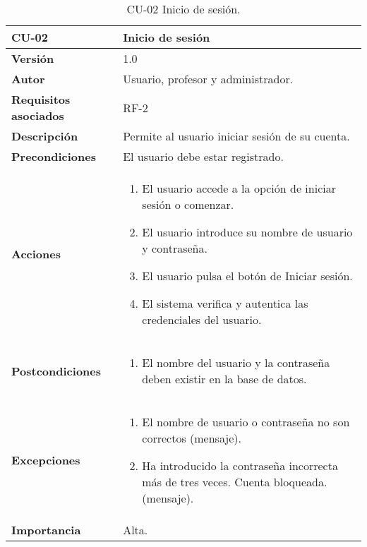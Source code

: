 \begin{table}[p]
	\centering
	\begin{tabularx}{\linewidth}{ p{} p{} }
		\toprule
		\textbf{CU-02}    & \textbf{Inicio de sesión}\\
		\toprule
		\textbf{Versión}              & 1.0    \\
		\textbf{Autor}                & Usuario, profesor y administrador. \\
		\textbf{Requisitos asociados} & RF-2\\
		\textbf{Descripción}          & Permite al usuario iniciar sesión de su cuenta. \\
		\textbf{Precondiciones}         & El usuario debe estar registrado. \\
		\textbf{Acciones}             &
		\begin{enumerate}
			\def\labelenumi{\arabic{enumi}.}
			\tightlist
			\item El usuario accede a la opción de iniciar sesión o comenzar.
			\item El usuario introduce su nombre de usuario y contraseña.
            \item El usuario pulsa el botón de Iniciar sesión.
            \item El sistema verifica y autentica las credenciales del usuario.
		\end{enumerate}\\
         \textbf{Postcondiciones}             &
		\begin{enumerate}
			\def\labelenumi{\arabic{enumi}.}
			\tightlist
			\item El nombre del usuario y la contraseña deben existir en la base de datos.
		\end{enumerate}\\
		\textbf{Excepciones}             &
		\begin{enumerate}
			\def\labelenumi{\arabic{enumi}.}
			\tightlist
			\item El nombre de usuario o contraseña no son correctos (mensaje).
			\item Ha introducido la contraseña incorrecta más de tres veces. Cuenta bloqueada. (mensaje).
		\end{enumerate}\\
		\textbf{Importancia}          & Alta. \\
		\bottomrule
	\end{tabularx}
	\caption{CU-02 Inicio de sesión.}
\end{table}

